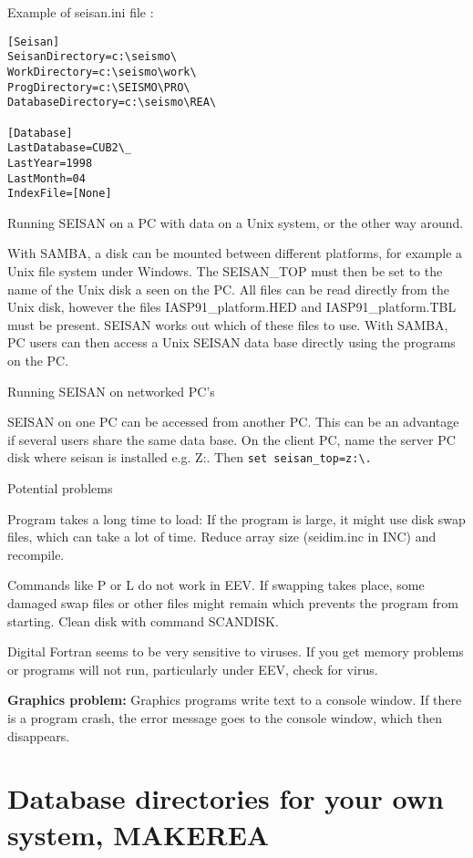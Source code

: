 Example of seisan.ini file : 

\begin{verbatim}
[Seisan]
SeisanDirectory=c:\seismo\
WorkDirectory=c:\seismo\work\
ProgDirectory=c:\SEISMO\PRO\
DatabaseDirectory=c:\seismo\REA\ 

[Database]
LastDatabase=CUB2\_
LastYear=1998
LastMonth=04
IndexFile=[None] 
\end{verbatim}

Running SEISAN on a PC with data on a Unix system, or the other way around.

 With SAMBA, a disk can be mounted between different platforms, for example a Unix file system under Windows. The SEISAN\_TOP must then be set to the name of the Unix disk a seen on the PC. All files can be read directly from the Unix disk, however the files IASP91\_platform.HED and IASP91\_platform.TBL must be present. SEISAN works out which of these files to use. With SAMBA, PC users can then access a Unix SEISAN data base directly using the programs on the PC. 

Running SEISAN on networked PC's %

SEISAN on one PC can be accessed from another PC. 
This can be an advantage if several 
users share the same data base. On the client PC, name the server PC disk where 
seisan is installed e.g. Z:. Then \texttt{set seisan\_top=z:\textbackslash .}

Potential problems \index{Problem, PC} 

Program takes a long time to load: If the program is large, it might use disk swap files, which can take a lot of time. Reduce array size (seidim.inc in INC) and recompile. 

Commands like P or L do not work in EEV. If swapping takes place, some damaged swap files or other files might remain which prevents the program from starting. Clean disk with command SCANDISK. 

Digital Fortran seems to be very sensitive to viruses. If you get memory problems or programs will not run, particularly under EEV, check for virus. 

\textbf{Graphics problem:} Graphics programs write text to a console window. If there is a program crash, the error message goes to the console window, which then disappears. 

\section{Database directories for your own system, MAKEREA} 

